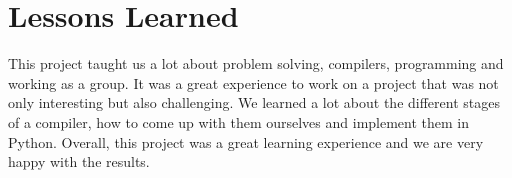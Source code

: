 \section{Lessons Learned}

This project taught us a lot about problem solving, compilers, programming and working as a group.
It was a great experience to work on a project that was not only interesting but also challenging. 
We learned a lot about the different stages of a compiler, how to come up with them ourselves and implement them in Python.  
Overall, this project was a great learning experience and we are very happy with the results.
